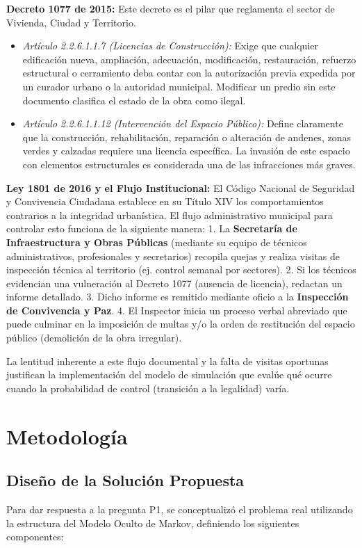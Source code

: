 \documentclass[12pt,letterpaper]{article}
\begin{document}
\textbf{Decreto 1077 de 2015:} Este decreto es el pilar que reglamenta el sector de Vivienda, Ciudad y Territorio. 
\begin{itemize}
    \item \textit{Artículo 2.2.6.1.1.7 (Licencias de Construcción):} Exige que cualquier edificación nueva, ampliación, adecuación, modificación, restauración, refuerzo estructural o cerramiento deba contar con la autorización previa expedida por un curador urbano o la autoridad municipal. Modificar un predio sin este documento clasifica el estado de la obra como ilegal.
    \item \textit{Artículo 2.2.6.1.1.12 (Intervención del Espacio Público):} Define claramente que la construcción, rehabilitación, reparación o alteración de andenes, zonas verdes y calzadas requiere una licencia específica. La invasión de este espacio con elementos estructurales es considerada una de las infracciones más graves.
\end{itemize}

\textbf{Ley 1801 de 2016 y el Flujo Institucional:} El Código Nacional de Seguridad y Convivencia Ciudadana establece en su Título XIV los comportamientos contrarios a la integridad urbanística. El flujo administrativo municipal para controlar esto funciona de la siguiente manera:
1. La \textbf{Secretaría de Infraestructura y Obras Públicas} (mediante su equipo de técnicos administrativos, profesionales y secretarios) recopila quejas y realiza visitas de inspección técnica al territorio (ej. control semanal por sectores).
2. Si los técnicos evidencian una vulneración al Decreto 1077 (ausencia de licencia), redactan un informe detallado.
3. Dicho informe es remitido mediante oficio a la \textbf{Inspección de Convivencia y Paz}.
4. El Inspector inicia un proceso verbal abreviado que puede culminar en la imposición de multas y/o la orden de restitución del espacio público (demolición de la obra irregular).

La lentitud inherente a este flujo documental y la falta de visitas oportunas justifican la implementación del modelo de simulación que evalúe qué ocurre cuando la probabilidad de control (transición a la legalidad) varía.

\section{Metodología}

\subsection{Diseño de la Solución Propuesta}
Para dar respuesta a la pregunta P1, se conceptualizó el problema real utilizando la estructura del Modelo Oculto de Markov, definiendo los siguientes componentes:
\end{document}
